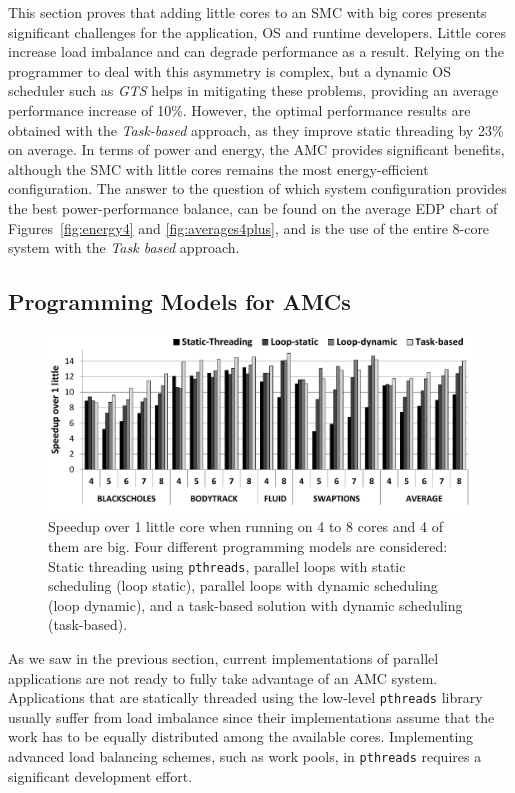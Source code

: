 This section proves that adding little cores to an SMC with big cores presents significant challenges for the application, OS and runtime developers. 
Little cores increase load imbalance and can degrade performance as a result. 
Relying on the programmer to deal with this asymmetry is complex, but a dynamic OS scheduler such as \emph{GTS} helps in mitigating these problems, providing an average performance increase of 10\%. 
However, the optimal performance results are obtained with the \emph{Task-based} approach, as they improve static threading by 23\% on average. 
In terms of power and energy, the AMC provides significant benefits, although the SMC with little cores remains the most energy-efficient configuration. 
The answer to the question of which system configuration provides the best power-performance balance, can be found on the average EDP chart of Figures~\ref{fig:energy4} and \ref{fig:averages4plus}, and is the use of the entire 8-core system with the \emph{Task based} approach.

\subsection{Programming Models for AMCs}

\begin{figure}
        \centering
        \includegraphics[width=\columnwidth]{figures/speedup-ompssVSopenmp}
        \caption{Speedup over 1 little core when running on 4 to 8 cores and 4 of them are big. 
Four different programming models are considered: Static threading using \texttt{pthreads}, 
parallel loops with static scheduling (loop static), parallel loops with dynamic scheduling (loop 
dynamic), and a task-based solution with dynamic scheduling (task-based).}%
        \label{fig:prog_models}%
\end{figure}

As we saw in the previous section, current implementations of parallel applications are not ready to fully take advantage of an AMC system.
Applications that are statically threaded using the low-level \texttt{pthreads} library usually suffer from load imbalance since their implementations assume that the work has to be equally distributed among the available cores. 
Implementing advanced load balancing schemes, such as
work pools, in \texttt{pthreads} requires a significant development effort.

